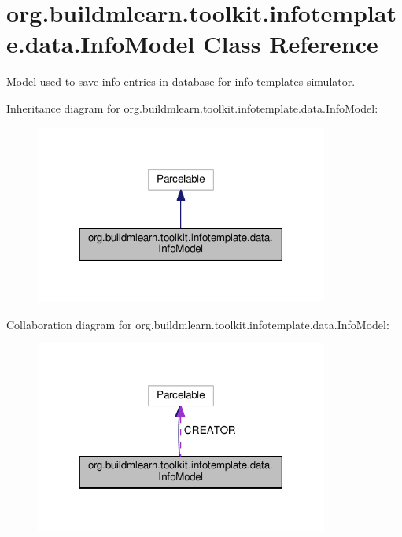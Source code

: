 \hypertarget{classorg_1_1buildmlearn_1_1toolkit_1_1infotemplate_1_1data_1_1InfoModel}{}\section{org.\+buildmlearn.\+toolkit.\+infotemplate.\+data.\+Info\+Model Class Reference}
\label{classorg_1_1buildmlearn_1_1toolkit_1_1infotemplate_1_1data_1_1InfoModel}


Model used to save info entries in database for info template\textquotesingle{}s simulator.  




Inheritance diagram for org.\+buildmlearn.\+toolkit.\+infotemplate.\+data.\+Info\+Model\+:
\nopagebreak
\begin{figure}[H]
\begin{center}
\leavevmode
\includegraphics[width=273pt]{classorg_1_1buildmlearn_1_1toolkit_1_1infotemplate_1_1data_1_1InfoModel__inherit__graph}
\end{center}
\end{figure}


Collaboration diagram for org.\+buildmlearn.\+toolkit.\+infotemplate.\+data.\+Info\+Model\+:
\nopagebreak
\begin{figure}[H]
\begin{center}
\leavevmode
\includegraphics[width=273pt]{classorg_1_1buildmlearn_1_1toolkit_1_1infotemplate_1_1data_1_1InfoModel__coll__graph}
\end{center}
\end{figure}
